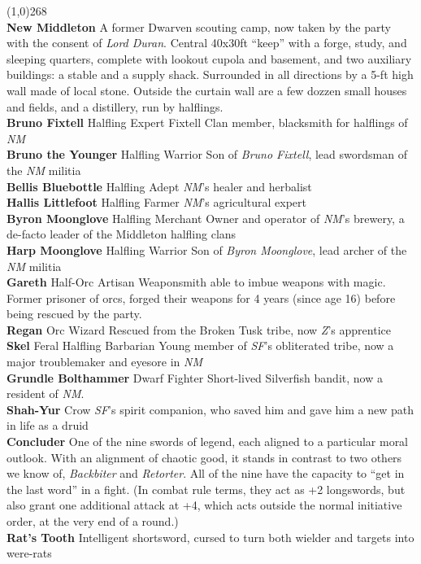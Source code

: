 \documentclass[letterpaper]{article}
\newcommand{\colline}{\noindent\line(1,0){268} \\}
\newcommand{\e}[1]{\emph{#1}}
\newcommand{\B}[1]{\textbf{#1}}
\newenvironment{notesection}[1]
{\noindent {\huge \B{#1}} \par
\vspace{-0.75em}
\colline
\begingroup\fontsize{9pt}{12pt}\selectfont}
{\endgroup}
\newcommand{\person}[3]{\noindent\B{#1
    \ifstrequal{#2}{M}{{\color{ProcessBlue}\male}}{%
    \ifstrequal{#2}{F}{\color{VioletRed}\female}{}}}{\scriptsize #3}}
\begin{document}
\begin{notesection}{People and Places}
\noindent\B{New Middleton} A former Dwarven scouting camp, now taken by the party with the consent of \e{Lord Duran}.  Central 40x30ft ``keep'' with a forge, study, and sleeping quarters, complete with lookout cupola and basement, and two auxiliary buildings: a stable and a supply shack. Surrounded in all directions by a 5-ft high wall made of local stone. Outside the curtain wall are a few dozzen small houses and fields, and a distillery, run by halflings. \\
\person{Bruno Fixtell}{M}{Halfling Expert} Fixtell Clan member, blacksmith for halflings of \e{NM} \\
\person{Bruno the Younger}{M}{Halfling Warrior} Son of \e{Bruno Fixtell}, lead swordsman of the \e{NM} militia \\
\person{Bellis Bluebottle}{F}{Halfling Adept} \e{NM}'s healer and herbalist \\
\person{Hallis Littlefoot}{F}{Halfling Farmer} \e{NM}'s agricultural expert \\
\person{Byron Moonglove}{M}{Halfling Merchant} Owner and operator of \e{NM}'s brewery, a de-facto leader of the Middleton halfling clans \\
\person{Harp Moonglove}{M}{Halfling Warrior} Son of \e{Byron Moonglove}, lead archer of the \e{NM} militia \\
\person{Gareth}{M}{Half-Orc Artisan} Weaponsmith able to imbue weapons with magic. Former prisoner of orcs, forged their weapons for 4 years (since age 16) before being rescued by the party. \\
\person{Regan}{M}{Orc Wizard} Rescued from the Broken Tusk tribe, now \e{Z}'s apprentice \\
\person{Skel}{M}{Feral Halfling Barbarian} Young member of \e{SF}'s obliterated tribe, now a major troublemaker and eyesore in \e{NM} \\
\person{Grundle Bolthammer}{F}{Dwarf Fighter} Short-lived Silverfish bandit, now a resident of \e{NM}.\\
\person{Shah-Yur}{M}{Crow} \e{SF}'s spirit companion, who saved him and gave him a new path in life as a druid\\
\noindent\B{Concluder} One of the nine swords of legend, each aligned to a particular moral outlook. With an alignment of chaotic good, it stands in contrast to two others we know of, \e{Backbiter} and \e{Retorter}. All of the nine have the capacity to ``get in the last word'' in a fight. (In combat rule terms, they act as +2 longswords, but also grant one additional attack at +4, which acts outside the normal initiative order, at the very end of a round.)\\
\noindent\B{Rat's Tooth} Intelligent shortsword, cursed to turn both wielder and targets into were-rats\\


\end{notesection}
\end{document}
